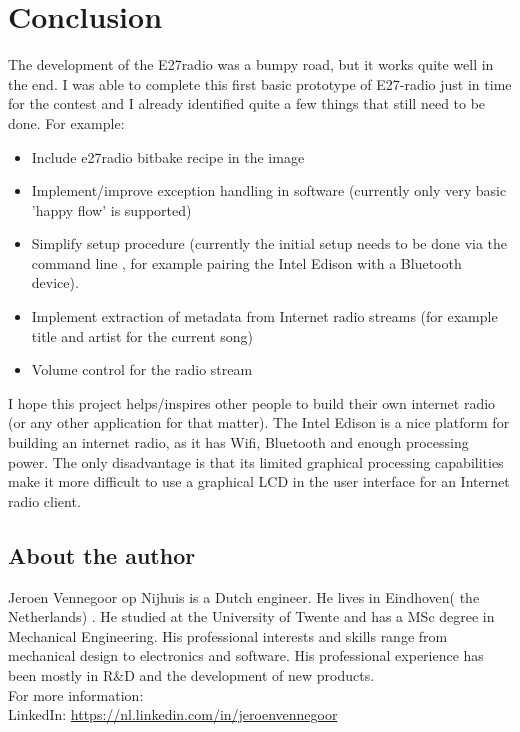 \documentclass[12pt,a4paper]{scrreprt}
\begin{document}
\chapter{Conclusion}
The development of the E27radio was a bumpy road, but it works quite well in the end. I was able to complete this first basic prototype of E27-radio just in time for the contest and I already identified quite a few things that still need to be done. For example:
\begin{itemize}
	\item Include e27radio bitbake recipe in the image
	\item Implement/improve exception handling in software 
	(currently only very basic 'happy flow' is supported)
	\item Simplify setup procedure (currently the initial setup needs to be done via the command line , for example pairing the Intel Edison with a Bluetooth device).
	\item Implement extraction of metadata from Internet radio streams (for example title and artist for the current song)
	\item Volume control for the radio stream
\end{itemize}
I hope this project helps/inspires other people to build their own internet radio (or any other application for that matter). The Intel Edison is a nice platform for building an internet radio, as it has Wifi, Bluetooth and enough processing power. The only disadvantage is that its limited graphical processing capabilities make it more difficult to use a graphical LCD in the user interface for an Internet radio client.

\begin{appendices}

\chapter{About the author}
Jeroen Vennegoor op Nijhuis is a Dutch engineer. 
He lives in Eindhoven( the Netherlands) . He studied at the University of Twente and has a MSc degree in Mechanical Engineering. His professional interests and skills  range from mechanical design to electronics and software. His professional experience has been mostly in R\&D and the development of new products.\\
For more information:\\
LinkedIn: \url{https://nl.linkedin.com/in/jeroenvennegoor}

\end{appendices}
\end{document}
